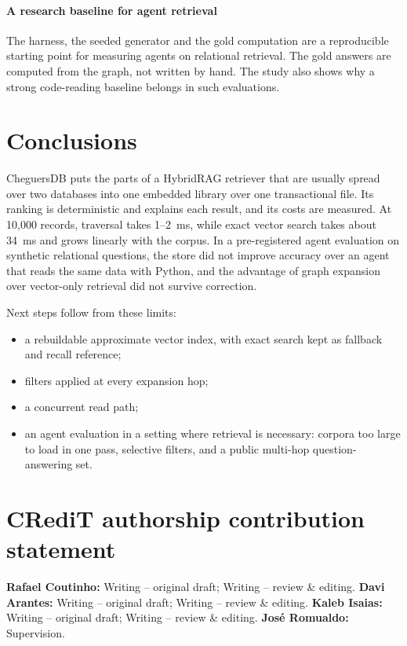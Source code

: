 \documentclass[preprint,12pt,a4paper]{elsarticle}
\begin{document}
\paragraph{A research baseline for agent retrieval} The harness, the seeded generator and the gold computation are a reproducible starting point for measuring agents on relational retrieval. The gold answers are computed from the graph, not written by hand. The study also shows why a strong code-reading baseline belongs in such evaluations.

\section{Conclusions}
\label{sec:conclusions}

CheguersDB puts the parts of a HybridRAG retriever that are usually spread over two databases into one embedded library over one transactional file. Its ranking is deterministic and explains each result, and its costs are measured. At 10,000 records, traversal takes 1--2~ms, while exact vector search takes about 34~ms and grows linearly with the corpus. In a pre-registered agent evaluation on synthetic relational questions, the store did not improve accuracy over an agent that reads the same data with Python, and the advantage of graph expansion over vector-only retrieval did not survive correction.

Next steps follow from these limits:
\begin{itemize}
  \item a rebuildable approximate vector index, with exact search kept as fallback and recall reference;
  \item filters applied at every expansion hop;
  \item a concurrent read path;
  \item an agent evaluation in a setting where retrieval is necessary: corpora too large to load in one pass, selective filters, and a public multi-hop question-answering set.
\end{itemize}

\section*{CRediT authorship contribution statement}

\textbf{Rafael Coutinho:} Writing -- original draft; Writing -- review \& editing. \textbf{Davi Arantes:} Writing -- original draft; Writing -- review \& editing. \textbf{Kaleb Isaias:} Writing -- original draft; Writing -- review \& editing. \textbf{Jos\'e Romualdo:} Supervision.
\end{document}
